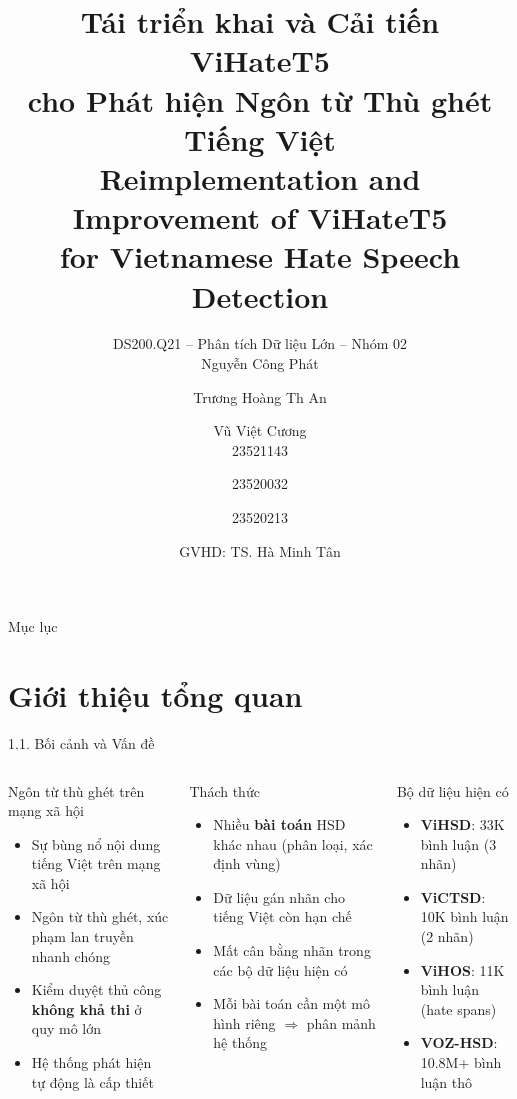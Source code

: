 \documentclass[11pt, aspectratio=169]{beamer}
\title[ViHateT5]{\textbf{Tái triển khai và Cải tiến ViHateT5 \\ cho Phát hiện Ngôn từ Thù ghét Tiếng Việt} \\ \textbf{Reimplementation and Improvement of ViHateT5 \\ for Vietnamese Hate Speech Detection}}
\author[DS200.Q21]{DS200.Q21 -- Phân tích Dữ liệu Lớn -- Nhóm 02 \\[0.3em]
Nguyễn Công Phát \and Trương Hoàng Th An \and Vũ Việt Cương \\
23521143 \and 23520032 \and 23520213}
\institute[UIT]{Trường Đại học Công nghệ Thông tin -- ĐHQG TP.HCM}
\date{GVHD: TS. Hà Minh Tân}
\begin{document}
\begin{frame}[plain]
  \titlepage
\end{frame}

\begin{frame}{Mục lục}
  \tableofcontents
\end{frame}

\section{Giới thiệu tổng quan}

\begin{frame}[fragile, shrink=10]{1.1. Bối cảnh và Vấn đề}
\begin{columns}[T]
  \begin{block}{Ngôn từ thù ghét trên mạng xã hội}
    \begin{itemize}
      \item Sự bùng nổ nội dung tiếng Việt trên mạng xã hội
      \item Ngôn từ thù ghét, xúc phạm lan truyền nhanh chóng
      \item Kiểm duyệt thủ công \textbf{không khả thi} ở quy mô lớn
      \item Hệ thống phát hiện tự động là cấp thiết
    \end{itemize}
  \end{block}

  \begin{block}{Thách thức}
    \begin{itemize}
      \item Nhiều \textbf{bài toán} HSD khác nhau (phân loại, xác định vùng)
      \item Dữ liệu gán nhãn cho tiếng Việt còn hạn chế
      \item Mất cân bằng nhãn trong các bộ dữ liệu hiện có
      \item Mỗi bài toán cần một mô hình riêng $\Rightarrow$ phân mảnh hệ thống
    \end{itemize}
  \end{block}

  \begin{block}{Bộ dữ liệu hiện có}
    \begin{itemize}
      \item \textbf{ViHSD}: 33K bình luận (3 nhãn)
      \item \textbf{ViCTSD}: 10K bình luận (2 nhãn)
      \item \textbf{ViHOS}: 11K bình luận (hate spans)
      \item \textbf{VOZ-HSD}: 10.8M+ bình luận thô
    \end{itemize}
  \end{block}


\end{columns}
\end{frame}
\end{document}
